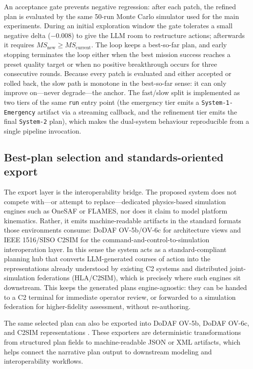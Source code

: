 An acceptance gate prevents negative regression: after each patch, the refined plan is evaluated by the same 50-run Monte Carlo simulator used for the main experiments. During an initial exploration window the gate tolerates a small negative delta ($-0.008$) to give the LLM room to restructure actions; afterwards it requires $MS_{\text{new}} \ge MS_{\text{current}}$. The loop keeps a best-so-far plan, and early stopping terminates the loop either when the best mission success reaches a preset quality target or when no positive breakthrough occurs for three consecutive rounds. Because every patch is evaluated and either accepted or rolled back, the slow path is monotone in the best-so-far sense: it can only improve on---never degrade---the anchor. The fast/slow split is implemented as two tiers of the same \texttt{run} entry point (the emergency tier emits a \texttt{System-1-Emergency} artifact via a streaming callback, and the refinement tier emits the final \texttt{System-2} plan), which makes the dual-system behaviour reproducible from a single pipeline invocation.

\subsection{Best-plan selection and standards-oriented export}

The export layer is the interoperability bridge. The proposed system does not compete with---or attempt to replace---dedicated physics-based simulation engines such as OneSAF or FLAMES, nor does it claim to model platform kinematics. Rather, it emits machine-readable artifacts in the standard formats those environments consume: DoDAF OV-5b/OV-6c for architecture views and IEEE 1516/SISO C2SIM for the command-and-control-to-simulation interoperation layer. In this sense the system acts as a standard-compliant planning hub that converts LLM-generated courses of action into the representations already understood by existing C2 systems and distributed joint-simulation federations (HLA/C2SIM), which is precisely where such engines sit downstream. This keeps the generated plans engine-agnostic: they can be handed to a C2 terminal for immediate operator review, or forwarded to a simulation federation for higher-fidelity assessment, without re-authoring.

The same selected plan can also be exported into DoDAF OV-5b, DoDAF OV-6c, and C2SIM representations \citep{dodaf2010,ieee2010hla,siso2020c2sim,blais2021automated}. These exporters are deterministic transformations from structured plan fields to machine-readable JSON or XML artifacts, which helps connect the narrative plan output to downstream modeling and interoperability workflows.

